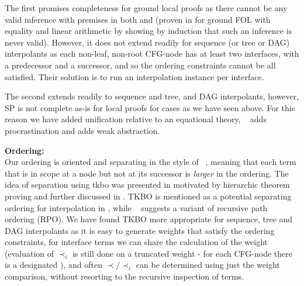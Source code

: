 The first promises completeness for ground local proofs as there cannot be any valid inference with premises in 
both \langtp and \langbp (proven in \cite{KovacsVoronkov09} for ground FOL with equality and linear arithmetic by showing by induction that such an inference is never valid). 
However, it does not extend readily for sequence (or tree or DAG) interpolants as each non-leaf, non-root CFG-node has at least two interfaces, with a predecessor and a successor, and so the ordering constraints cannot be all satisfied. Their solution is to run an interpolation instance per interface.


The second extends readily to sequence and tree, and DAG interpolants, however, SP is not complete as-is for local proofs for cases as we have seen above. For this reason we have added unification relative to an equational theory, ~\cite{McMillan08} adds procrastination and \cite{BaumgartnerWaldmann13} adds weak abstraction.


\textbf{Ordering:}\\
Our ordering is oriented and separating in the style of ~\cite{McMillan08}, meaning that each term that is in scope at a node but not at its successor is \emph{larger} in the ordering. The idea of separation using tkbo was presented in \cite{LudwigWaldmann07} motivated by hierarchic theorem proving and further discussed in \cite{KovacsMoserVoronkov11}.
TKBO is mentioned as a potential separating ordering for interpolation in \cite{KovacsVoronkov09}, while ~\cite{McMillan08} suggests a variant of recursive path ordering (RPO). We have found TKBO more appropriate for sequence, tree and DAG interpolants as it is easy to generate weights that satisfy the ordering constraints, for interface terms we can share the calculation of the weight 
(evaluation of $\prec_i$ is still done on a truncated weight - for each CFG-node there is a designated ), 
and often $\prec/\prec_i$ can be determined using just the weight comparison, without resorting to the recursive inspection of terms.
